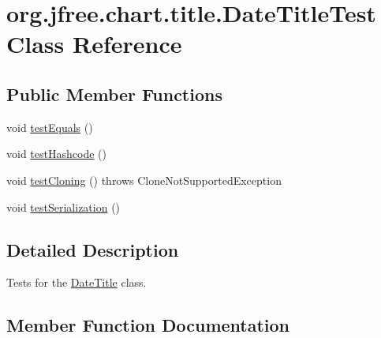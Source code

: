 \hypertarget{classorg_1_1jfree_1_1chart_1_1title_1_1_date_title_test}{}\section{org.\+jfree.\+chart.\+title.\+Date\+Title\+Test Class Reference}
\label{classorg_1_1jfree_1_1chart_1_1title_1_1_date_title_test}
\subsection*{Public Member Functions}
\begin{DoxyCompactItemize}
\item 
void \mbox{\hyperlink{classorg_1_1jfree_1_1chart_1_1title_1_1_date_title_test_a92c09df13db6d6f86ac530abfdeb083d}{test\+Equals}} ()
\item 
void \mbox{\hyperlink{classorg_1_1jfree_1_1chart_1_1title_1_1_date_title_test_afbe7ef980a3627078c6b7fdf05e91598}{test\+Hashcode}} ()
\item 
void \mbox{\hyperlink{classorg_1_1jfree_1_1chart_1_1title_1_1_date_title_test_aba1e52242a5ef431c9da330aa6387f6e}{test\+Cloning}} ()  throws Clone\+Not\+Supported\+Exception 
\item 
void \mbox{\hyperlink{classorg_1_1jfree_1_1chart_1_1title_1_1_date_title_test_a9f101f13cca41eb201a4e9e3d17fa2b9}{test\+Serialization}} ()
\end{DoxyCompactItemize}


\subsection{Detailed Description}
Tests for the \mbox{\hyperlink{classorg_1_1jfree_1_1chart_1_1title_1_1_date_title}{Date\+Title}} class. 

\subsection{Member Function Documentation}
\mbox{\label{classorg_1_1jfree_1_1chart_1_1title_1_1_date_title_test_aba1e52242a5ef431c9da330aa6387f6e}} 
